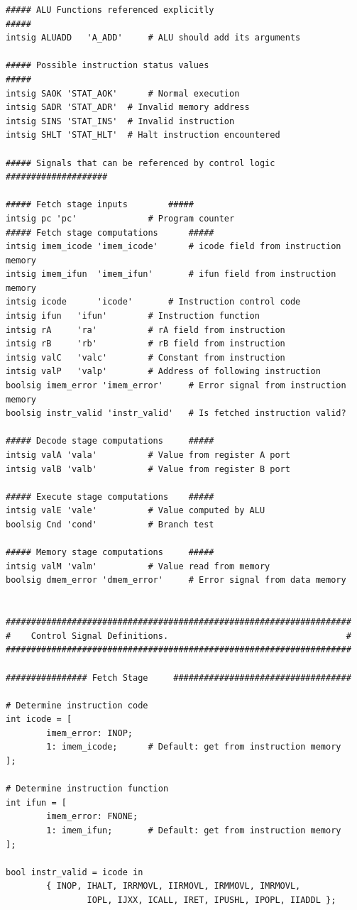 \documentclass{article}
\begin{document}
\begin{lstlisting}[caption={seq-full.hcl}, label={cd:seq}]
##### ALU Functions referenced explicitly                            #####
intsig ALUADD	'A_ADD'		# ALU should add its arguments

##### Possible instruction status values                             #####
intsig SAOK	'STAT_AOK'		# Normal execution
intsig SADR	'STAT_ADR'	# Invalid memory address
intsig SINS	'STAT_INS'	# Invalid instruction
intsig SHLT	'STAT_HLT'	# Halt instruction encountered

##### Signals that can be referenced by control logic ####################

##### Fetch stage inputs		#####
intsig pc 'pc'				# Program counter
##### Fetch stage computations		#####
intsig imem_icode 'imem_icode'		# icode field from instruction memory
intsig imem_ifun  'imem_ifun' 		# ifun field from instruction memory
intsig icode	  'icode'		# Instruction control code
intsig ifun	  'ifun'		# Instruction function
intsig rA	  'ra'			# rA field from instruction
intsig rB	  'rb'			# rB field from instruction
intsig valC	  'valc'		# Constant from instruction
intsig valP	  'valp'		# Address of following instruction
boolsig imem_error 'imem_error'		# Error signal from instruction memory
boolsig instr_valid 'instr_valid'	# Is fetched instruction valid?

##### Decode stage computations		#####
intsig valA	'vala'			# Value from register A port
intsig valB	'valb'			# Value from register B port

##### Execute stage computations	#####
intsig valE	'vale'			# Value computed by ALU
boolsig Cnd	'cond'			# Branch test

##### Memory stage computations		#####
intsig valM	'valm'			# Value read from memory
boolsig dmem_error 'dmem_error'		# Error signal from data memory


####################################################################
#    Control Signal Definitions.                                   #
####################################################################

################ Fetch Stage     ###################################

# Determine instruction code
int icode = [
        imem_error: INOP;
        1: imem_icode;		# Default: get from instruction memory
];

# Determine instruction function
int ifun = [
        imem_error: FNONE;
        1: imem_ifun;		# Default: get from instruction memory
];

bool instr_valid = icode in 
        { INOP, IHALT, IRRMOVL, IIRMOVL, IRMMOVL, IMRMOVL,
                IOPL, IJXX, ICALL, IRET, IPUSHL, IPOPL, IIADDL };


\end{lstlisting}
\end{document}
